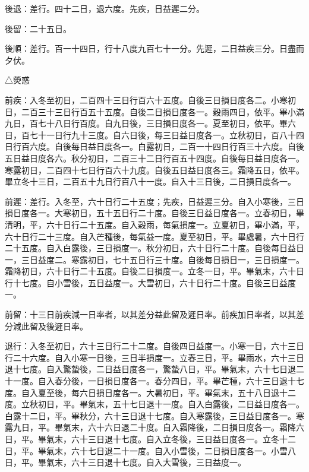 \begin{pinyinscope}
 後退：差行。四十二日，退六度。先疾，日益遲二分。



 後留：二十五日。



 後順：差行。百一十四日，行十八度九百七十一分。先遲，二日益疾三分。日盡而夕伏。



 △熒惑



 前疾：入冬至初日，二百四十三日行百六十五度。自後三日損日度各二。小寒初日，二百三十三日行百五十五度。自後二日損日度各一。穀雨四日，依平。畢小滿九日，百七十八日行百度。自九日後，三日損日度各一。夏至初日，依平。畢六日，百七十一日行九十三度。自六日後，每三日益日度各一。立秋初日，百八十四日行百六度。自後每日益日度各一。白露初日，二百一十四日行百三十六度。自後五日益日度各六。秋分初日，二百三十二日行百五十四度。自後每日益日度各一。寒露初日，二百四十七日行百六十九度。自後五日益日度各三。霜降五日，依平。畢立冬十三日，二百五十九日行百八十一度。自入十三日後，二日損日度各一。



 前遲：差行。入冬至，六十日行二十五度；先疾，日益遲三分。自入小寒後，三日損日度各一。大寒初日，五十五日行二十度。自後三日益日度各一。立春初日，畢清明，平，六十日行二十五度。自入穀雨，每氣損度一。立夏初日，畢小滿，平，六十日行二十三度。自入芒種後，每氣益一度。夏至初日，平。畢處暑，六十日行二十五度。自入白露後，三日損度一。秋分初日，六十日行二十度。自後每日益日一，三日益度二。寒露初日，七十五日行三十度。自後每日損日一，三日損度一。霜降初日，六十日行二十五度。自後二日損度一。立冬一日，平。畢氣末，六十日行十七度。自小雪後，五日益度一。大雪初日，六十日行二十度。自後三日益度一。



 前留：十三日前疾減一日率者，以其差分益此留及遲日率。前疾加日率者，以其差分減此留及後遲日率。



 退行：入冬至初日，六十三日行二十二度。自後四日益度一。小寒一日，六十三日行二十六度。自入小寒一日後，三日半損度一。立春三日，平。畢雨水，六十三日退十七度。自入驚蟄後，二日益日度各一，驚蟄八日，平。畢氣末，六十七日退二十一度。自入春分後，一日損日度各一。春分四日，平。畢芒種，六十三日退十七度。自入夏至後，每六日損日度各一。大暑初日，平。畢氣末，五十八日退十二度。立秋初日，平。畢氣末，五十七日退十一度。自入白露後，二日益日度各一。白露十二日，平。畢秋分，六十三日退十七度。自入寒露後，三日益日度各一。寒露九日，平。畢氣末，六十六日退二十度。自入霜降後，二日損日度各一。霜降六日，平。畢氣末，六十三日退十七度。自入立冬後，三日益日度各一。立冬十二日，平。畢氣末，六十七日退二十一度。自入小雪後，二日損日度各一。小雪八日，平。畢氣末，六十三日退十七度。自入大雪後，三日益度一。




\end{pinyinscope}
